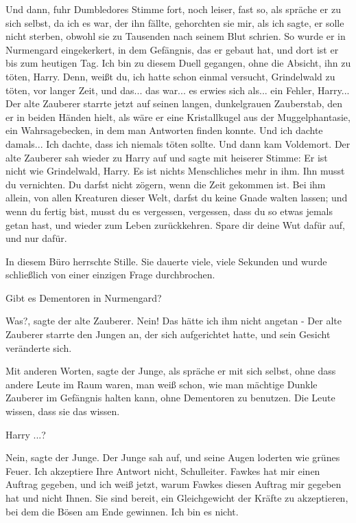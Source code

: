 \glqq Und dann\grqq{}, fuhr Dumbledores Stimme fort, noch leiser, fast so, als
spräche er zu sich selbst, \glqq da ich es war, der ihn fällte, gehorchten sie
mir, als ich sagte, er solle nicht sterben, obwohl sie zu Tausenden nach seinem
Blut schrien. So wurde er in Nurmengard eingekerkert, in dem Gefängnis, das er
gebaut hat, und dort ist er bis zum heutigen Tag. Ich bin zu diesem Duell
gegangen, ohne die Absicht, ihn zu töten, Harry. Denn, weißt du, ich hatte schon
einmal versucht, Grindelwald zu töten, vor langer Zeit, und das... das war... es
erwies sich als... ein Fehler, Harry...\grqq{} Der alte Zauberer starrte jetzt
auf seinen langen, dunkelgrauen Zauberstab, den er in beiden Händen hielt, als
wäre er eine Kristallkugel aus der Muggelphantasie, ein Wahrsagebecken, in dem
man Antworten finden konnte. \glqq Und ich dachte damals... Ich dachte, dass ich
niemals töten sollte. Und dann kam Voldemort.\grqq{} Der alte Zauberer sah
wieder zu Harry auf und sagte mit heiserer Stimme: \glqq Er ist nicht wie
Grindelwald, Harry. Es ist nichts Menschliches mehr in ihm. Ihn musst du
vernichten. Du darfst nicht zögern, wenn die Zeit gekommen ist. Bei ihm allein,
von allen Kreaturen dieser Welt, darfst du keine Gnade walten lassen; und wenn
du fertig bist, musst du es vergessen, vergessen, dass du so etwas jemals getan
hast, und wieder zum Leben zurückkehren. Spare dir deine Wut dafür auf, und nur
dafür.\grqq{}

In diesem Büro herrschte Stille. Sie dauerte viele, viele Sekunden und wurde
schließlich von einer einzigen Frage durchbrochen.

\glqq Gibt es Dementoren in Nurmengard?\grqq{}

\glqq Was?\grqq{}, sagte der alte Zauberer. \glqq Nein! Das hätte ich ihm nicht
angetan -\grqq{} Der alte Zauberer starrte den Jungen an, der sich aufgerichtet
hatte, und sein Gesicht veränderte sich.

\glqq Mit anderen Worten\grqq{}, sagte der Junge, als spräche er mit sich
selbst, ohne dass andere Leute im Raum waren, \glqq man weiß schon, wie man
mächtige Dunkle Zauberer im Gefängnis halten kann, ohne Dementoren zu benutzen.
Die Leute wissen, dass sie das wissen.\grqq{}

\glqq Harry ...?\grqq{}

\glqq Nein\grqq{}, sagte der Junge. Der Junge sah auf, und seine Augen loderten
wie grünes Feuer. \glqq Ich akzeptiere Ihre Antwort nicht, Schulleiter. Fawkes
hat mir einen Auftrag gegeben, und ich weiß jetzt, warum Fawkes diesen Auftrag
mir gegeben hat und nicht Ihnen. Sie sind bereit, ein Gleichgewicht der Kräfte
zu akzeptieren, bei dem die Bösen am Ende gewinnen. Ich bin es nicht.\grqq{}

